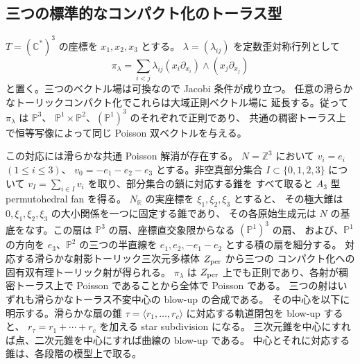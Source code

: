 \subsection{三つの標準的なコンパクト化のトーラス型}
$T=(\mathbb C^*)^3$ の座標を $x_1,x_2,x_3$ とする。
$\lambda=(\lambda_{ij})$ を定数歪対称行列として
\[
 \pi_\lambda=\sum_{i<j}\lambda_{ij}
 (x_i\partial_{x_i})\wedge(x_j\partial_{x_j})
\]
と置く。三つのベクトル場は可換なので Jacobi 条件が成り立つ。
任意の滑らかなトーリックコンパクト化でこれらは大域正則ベクトル場に
延長する。従って $\pi_\lambda$ は $\mathbb P^3$、
$\mathbb P^1\times\mathbb P^2$、$(\mathbb P^1)^3$ のそれぞれで正則であり、
共通の稠密トーラス上で恒等写像によって同じ Poisson 双ベクトルを与える。

この対応には滑らかな共通 Poisson 解消が存在する。
$N=\mathbb Z^3$ において $v_i=e_i$ $(1\le i\le3)$、
$v_0=-e_1-e_2-e_3$ とする。非空真部分集合 $I\subset\{0,1,2,3\}$
について $v_I=\sum_{i\in I}v_i$ を取り、部分集合の鎖に対応する錐を
すべて取ると $A_3$ 型 permutohedral fan を得る。
$N_{\mathbb R}$ の実座標を $\xi_1,\xi_2,\xi_3$ とすると、
その極大錐は $0,\xi_1,\xi_2,\xi_3$ の大小関係を一つに固定する錐であり、
その各原始生成元は $N$ の基底をなす。この扇は
$\mathbb P^3$ の扇、座標直交象限からなる $(\mathbb P^1)^3$ の扇、
および、$\mathbb P^1$ の方向を $e_3$、$\mathbb P^2$ の三つの半直線を
$e_1,e_2,-e_1-e_2$ とする積の扇を細分する。
対応する滑らかな射影トーリック三次元多様体 $Z_{\rm per}$ から三つの
コンパクト化への固有双有理トーリック射が得られる。
$\pi_\lambda$ は $Z_{\rm per}$ 上でも正則であり、各射が稠密トーラス上で
Poisson であることから全体で Poisson である。
三つの射はいずれも滑らかなトーラス不変中心の blow-up の合成である。
その中心を以下に明示する。滑らかな扇の錐
$\tau=\langle r_1,\ldots,r_c\rangle$ に対応する軌道閉包を blow-up すると、
$r_\tau=r_1+\cdots+r_c$ を加える star subdivision になる。
三次元錐を中心にすれば点、二次元錐を中心にすれば曲線の blow-up である。
中心とそれに対応する錐は、各段階の模型上で取る。

